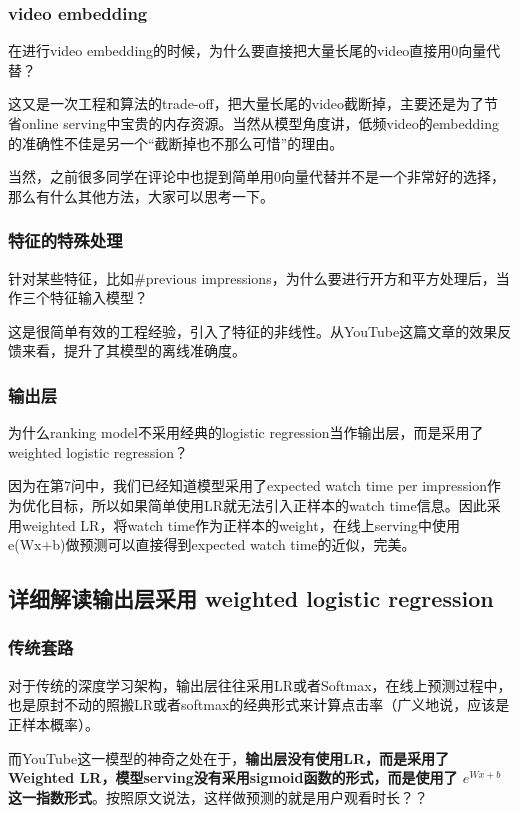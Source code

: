 \documentclass[12pt]{article}
\begin{document}
\subsubsection{video embedding}
在进行video embedding的时候，为什么要直接把大量长尾的video直接用0向量代替？

这又是一次工程和算法的trade-off，把大量长尾的video截断掉，主要还是为了节省online serving中宝贵的内存资源。当然从模型角度讲，低频video的embedding的准确性不佳是另一个“截断掉也不那么可惜”的理由。

当然，之前很多同学在评论中也提到简单用0向量代替并不是一个非常好的选择，那么有什么其他方法，大家可以思考一下。

\subsubsection{特征的特殊处理}
针对某些特征，比如\#previous impressions，为什么要进行开方和平方处理后，当作三个特征输入模型？

这是很简单有效的工程经验，引入了特征的非线性。从YouTube这篇文章的效果反馈来看，提升了其模型的离线准确度。

\subsubsection{输出层}
为什么ranking model不采用经典的logistic regression当作输出层，而是采用了weighted logistic regression？

因为在第7问中，我们已经知道模型采用了expected watch time per impression作为优化目标，所以如果简单使用LR就无法引入正样本的watch time信息。因此采用weighted LR，将watch time作为正样本的weight，在线上serving中使用e(Wx+b)做预测可以直接得到expected watch time的近似，完美。

\subsection{详细解读输出层采用 weighted logistic regression}
\subsubsection{传统套路}
对于传统的深度学习架构，输出层往往采用LR或者Softmax，在线上预测过程中，也是原封不动的照搬LR或者softmax的经典形式来计算点击率（广义地说，应该是正样本概率）。

而YouTube这一模型的神奇之处在于，\textbf{输出层没有使用LR，而是采用了Weighted LR，模型serving没有采用sigmoid函数的形式，而是使用了
$e^{Wx+b}$这一指数形式}。按照原文说法，这样做预测的就是用户观看时长？？
\end{document}
